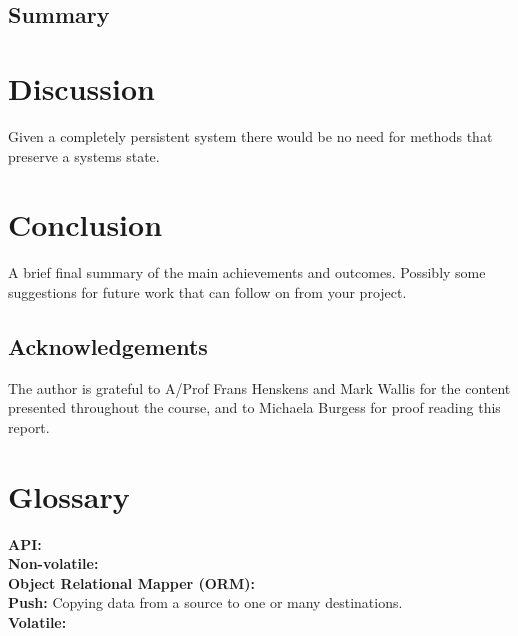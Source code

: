 \documentclass[a4paper,12pt]{article}
\begin{document}
\subsection{Summary}
\newpage
\section{Discussion}\label{sec:discussion}
Given a completely persistent system there would be no need for methods that preserve a systems state.
%
\section{Conclusion}
%
A brief final summary of the main achievements and outcomes. Possibly some suggestions for future work that can follow on from your project.%
%
\subsection*{Acknowledgements}
The author is grateful to A/Prof Frans Henskens and Mark Wallis for the content presented throughout the course, and to Michaela Burgess for proof reading this report.
\newpage
\section{Glossary}
\textbf{API:}
\\\textbf{Non-volatile:}
\\\textbf{Object Relational Mapper (ORM):} 
\\\textbf{Push:} Copying data from a source to one or many destinations. 
\\\textbf{Volatile:}
%

\vskip 0.2in
\newpage


\end{document}
